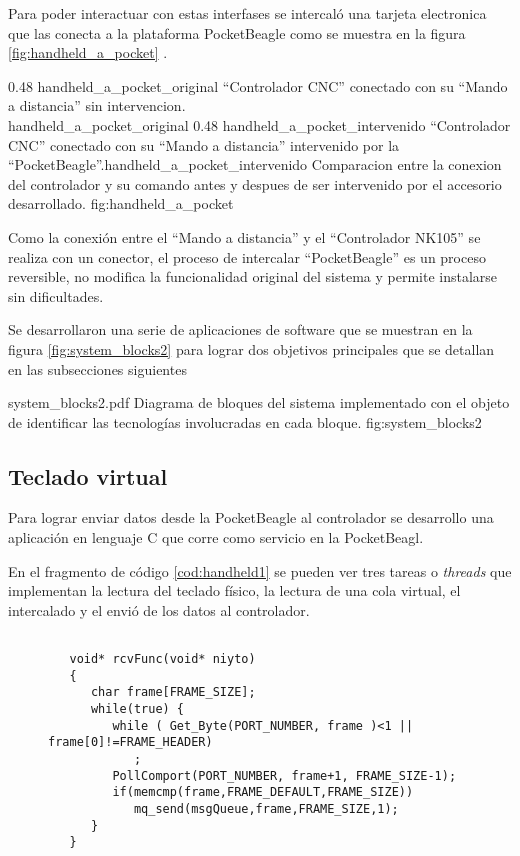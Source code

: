    Para poder interactuar con estas interfases se intercaló una tarjeta electronica que las conecta a la plataforma PocketBeagle como se muestra en la figura \ref{fig:handheld_a_pocket} .\par

\subfigab 
   {0.48} {handheld_a_pocket_original} { ``Controlador CNC'' conectado con su ``Mando a distancia'' sin intervencion.\\ \vphantom{1}}{handheld_a_pocket_original}
   {0.48} {handheld_a_pocket_intervenido} {``Controlador CNC'' conectado con su ``Mando a distancia'' intervenido por la\\ ``PocketBeagle''.}{handheld_a_pocket_intervenido}
   {Comparacion entre la conexion del controlador y su comando antes y despues de ser intervenido por el accesorio desarrollado.}
   {fig:handheld_a_pocket}

         Como la conexión entre el ``Mando a distancia'' y el ``Controlador NK105'' se realiza con un conector, el proceso de intercalar ``PocketBeagle'' es un proceso reversible, no modifica la funcionalidad original del sistema y permite instalarse sin dificultades.\par

   Se desarrollaron una serie de aplicaciones de software que se muestran en la figura \ref{fig:system_blocks2} para lograr dos objetivos principales que se detallan en las subsecciones siguientes

         {system_blocks2.pdf}
         {Diagrama de bloques del sistema implementado con el objeto de identificar las tecnologías involucradas en cada bloque.}
         {fig:system_blocks2}

\subsection{Teclado virtual}

      Para lograr enviar datos desde la PocketBeagle al controlador se desarrollo una aplicación en lenguaje C que corre como servicio en la PocketBeagl.\par
      En el fragmento de código \ref{cod:handheld1} se pueden ver tres tareas o \textit{threads} que implementan la lectura del teclado físico, la lectura de una cola virtual, el intercalado y el envió de los datos al controlador.\par

\begin{figure}
   \begin{lstlisting}[label={cod:handheld1},caption={Tarea encargada de procesar los datos del teclado fisico y reenviarlos a la cola de multiplexado.}]

   void* rcvFunc(void* niyto)
   {
      char frame[FRAME_SIZE];
      while(true) {
         while ( Get_Byte(PORT_NUMBER, frame )<1 || frame[0]!=FRAME_HEADER)
            ;
         PollComport(PORT_NUMBER, frame+1, FRAME_SIZE-1);
         if(memcmp(frame,FRAME_DEFAULT,FRAME_SIZE))
            mq_send(msgQueue,frame,FRAME_SIZE,1);
      }
   }
   \end{lstlisting}
\end{figure}

